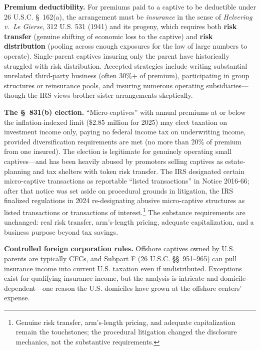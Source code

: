 \documentclass[11pt,openany]{book}
\begin{document}
\textbf{Premium deductibility.} For premiums paid to a captive to be
deductible under 26 U.S.C. \S~162(a), the arrangement must be
\emph{insurance} in the sense of \emph{Helvering v.\ Le Gierse}, 312 U.S. 531
(1941) and its progeny, which requires both \textbf{risk transfer} (genuine
shifting of economic loss to the captive) and \textbf{risk distribution}
(pooling across enough exposures for the law of large numbers to operate).
Single-parent captives insuring only the parent have historically struggled
with risk distribution. Accepted strategies include writing substantial
unrelated third-party business (often 30\%+ of premium), participating in
group structures or reinsurance pools, and insuring numerous operating
subsidiaries---though the IRS views brother-sister arrangements skeptically.

\textbf{The \S~831(b) election.} ``Micro-captives'' with annual premiums at
or below the inflation-indexed limit (\$2.85 million for 2025) may elect
taxation on investment income only, paying no federal income tax on
underwriting income, provided diversification requirements are met (no more
than 20\% of premium from one insured). The election is legitimate for
genuinely operating small captives---and has been heavily abused by promoters
selling captives as estate-planning and tax shelters with token risk
transfer. The IRS designated certain micro-captive transactions as reportable
``listed transactions'' in Notice 2016-66; after that notice was set aside on
procedural grounds in litigation, the IRS finalized regulations in 2024
re-designating abusive micro-captive structures as listed transactions or
transactions of interest.\footnote{Genuine risk transfer, arm's-length
pricing, and adequate capitalization remain the touchstones; the procedural
litigation changed the disclosure mechanics, not the substantive
requirements.} The substance requirements are unchanged: real risk transfer,
arm's-length pricing, adequate capitalization, and a business purpose beyond
tax savings.

\textbf{Controlled foreign corporation rules.} Offshore captives owned by
U.S. parents are typically CFCs, and Subpart F (26 U.S.C. \S\S~951--965) can
pull insurance income into current U.S. taxation even if undistributed.
Exceptions exist for qualifying insurance income, but the analysis is
intricate and domicile-dependent---one reason the U.S. domiciles have grown
at the offshore centers' expense.
\end{document}

